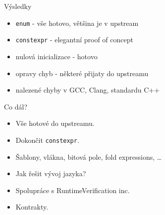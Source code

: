 \documentclass[11pt]{beamer}
\begin{document}
\begin{frame}{Výsledky}
\begin{itemize}
\pause \item \texttt{enum} - vše hotovo, většina je v upstream
\pause \item \texttt{constexpr} - elegantní proof of concept
\pause \item nulová inicializace - hotovo
\pause \item opravy chyb - některé přijaty do upstreamu
\pause \item nalezené chyby v GCC, Clang, standardu C++
\end{itemize}
\end{frame}

%
\begin{frame}{Co dál?}
\begin{itemize}
\pause \item Vše hotové do upstreamu.
\pause \item Dokončit \texttt{constexpr}.
\pause \item Šablony, vlákna, bitová pole, fold expressions, \ldots
\pause \item Jak řešit vývoj jazyka?
\pause \item Spolupráce s RuntimeVerification inc.
\pause \item Kontrakty.
\end{itemize}
\end{frame}
\end{document}
